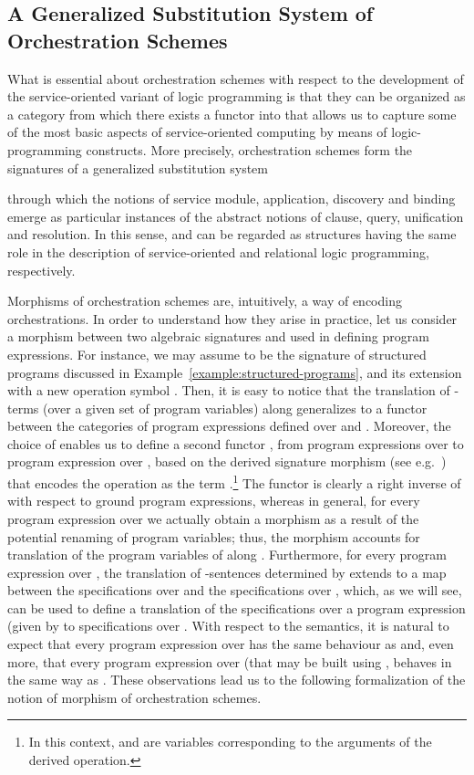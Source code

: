\documentclass{LMCS}
\begin{document}
  \subsection{A Generalized Substitution System of Orchestration Schemes}

  What is essential about orchestration schemes with respect to the development of the service-oriented variant of logic programming is that they can be organized as a category  from which there exists a functor  into  that allows us to capture some of the most basic aspects of service-oriented computing by means of logic-programming constructs.
  More precisely, orchestration schemes form the signatures of a generalized substitution system
  
  through which the notions of service module, application, discovery and binding emerge as particular instances of the abstract notions of clause, query, unification and resolution.
  In this sense,  and  can be regarded as structures having the same role in the description of service-oriented and relational logic programming, respectively.

  Morphisms of orchestration schemes are, intuitively, a way of encoding orchestrations.
  In order to understand how they arise in practice, let us consider a morphism  between two algebraic signatures  and  used in defining program expressions.  For instance, we may assume  to be the signature of structured programs discussed in Example~\ref{example:structured-programs}, and  its extension with a new operation symbol .
  Then, it is easy to notice that the translation of \nb-terms (over a given set of program variables) along  generalizes to a functor  between the categories of program expressions defined over  and .
  Moreover, the choice of  enables us to define a second functor , from program expressions over  to program expression over , based on the derived signature morphism (see e.g.~\cite{Sannella-Tarlecki:Foundations-of-Algebraic-Specification-2011})  that encodes the  operation as the term .\footnote{In this context,  and  are variables corresponding to the arguments of the derived operation.}
  The functor  is clearly a right inverse of  with respect to ground program expressions, whereas in general, for every program expression  over  we actually obtain a morphism  as a result of the potential renaming of program variables; thus, the morphism  accounts for translation of the program variables of  along .
  Furthermore, for every program expression  over , the translation of \nb-sentences determined by  extends to a map between the specifications over  and the specifications over , which, as we will see, can be used to define a translation of the specifications over a program expression  (given by  to specifications over .
  With respect to the semantics, it is natural to expect that every program expression  over  has the same behaviour as  and, even more, that every program expression  over  (that may be built using , behaves in the same way as .
  These observations lead us to the following formalization of the notion of morphism of orchestration schemes.
\end{document}
